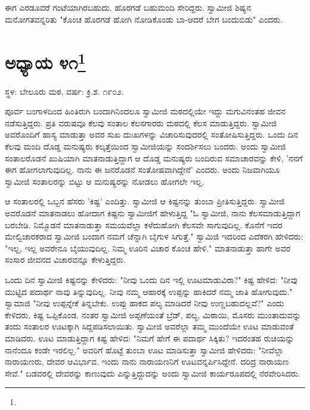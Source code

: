 ಈಗ ಎರಡೂವರೆ ಗಂಟೆಯಾಗಿರಬಹುದು. ಹೊರಗಡೆ ಬಹುಮಂದಿ ಸೇರಿದ್ದರು. ಸ್ವಾಮೀಜಿ ಶಿಷ್ಯನ ಮನೋಗತವನ್ನರಿತು "ಕೊಂಚ ಹೊರಗಡೆ ಹೋಗಿ ನೋಡಿಕೊಂಡು ಬಾ-ಆದರೆ ಬೇಗ ಬಂದುಬಿಡು" ಎಂದರು.

\newpage

\chapter[ಅಧ್ಯಾಯ ೪೧]{ಅಧ್ಯಾಯ ೪೧\protect\footnote{}}

\begin{center}
ಸ್ಥಳ: ಬೇಲೂರು ಮಠ, ವರ್ಷ: ಕ್ರಿ.ಶ. ೧೯೦೨.
\end{center}

ಪೂರ್ವ ಬಂಗಾಳದಿಂದ ಹಿಂತಿರುಗಿ ಬಂದಾಗಿನಿಂದಲೂ ಸ್ವಾಮೀಜಿ ಮಠದಲ್ಲಿಯೇ ಇದ್ದು ಮಗುವಿನಂತಹ ಜೀವನ ನಡೆಸುತ್ತಿದ್ದರು. ಪ್ರತಿ ವರುಷವೂ ಕೆಲವು ಸಂತಾಲ ಕೆಲಸಗಾರರು ಮಠದಲ್ಲಿ ಕೆಲಸ ಮಾಡುತ್ತಿದ್ದರು. ಸ್ವಾಮೀಜಿ ಅವರೊಂದಿಗೆ ಹಾಸ್ಯ ಮಾಡುತ್ತಾ ಅವರ ಸುಖ ದುಃಖಗಳನ್ನು ವಿಚಾರಿಸುವುದರಲ್ಲಿ ಸಂತೋಷಿಸುತ್ತಿದ್ದರು. ಒಂದು ದಿನ ಕೆಲವು ಮಂದಿ ದೊಡ್ಡ ಮನುಷ್ಯರು ಕಲ್ಕತ್ತೆಯಿಂದ ಸ್ವಾಮೀಜಿಯನ್ನು ಸಂದರ್ಶಿಸಲು ಬಂದರು. ಅಂದು ಸ್ವಾಮೀಜಿ ಸಂತಾಲರೊಡನೆ ಖುಷಿಯಾಗಿ ಮಾತನಾಡುತ್ತಿದ್ದಾಗ ಆ ದೊಡ್ಡ ಮನುಷ್ಯರು ಬಂದಿರುವ ಸಮಾಚಾರವನ್ನು ಕೇಳಿ, 'ನನಗೆ ಈಗ ಹೋಗಲಾಗುವುದಿಲ್ಲ. ನಾನು ಈ ಜನರೊಡನೆ ಸಂತೋಷವಾಗಿದ್ದೇನೆ' ಎಂದರು. ಅಂದು ನಿಜವಾಗಿಯೂ ಸ್ವಾಮೀಜಿ ಸಂತಾಲರನ್ನು ಬಿಟ್ಟು ಆ ಮನುಷ್ಯರನ್ನು ನೋಡಲು ಹೋಗಲೇ ಇಲ್ಲ.

ಆ ಸಂತಾಲರಲ್ಲಿ ಒಬ್ಬನ ಹೆಸರು 'ಕಿಷ್ಟ' ಎಂದಿತ್ತು. ಸ್ವಾಮೀಜಿ ಆ ಕಿಷ್ಟನನ್ನು ತುಂಬಾ ಪ್ರೀತಿಸುತ್ತಿದ್ದರು. ಸ್ವಾಮೀಜಿ ಅವರೊಡನೆ ಮಾತನಾಡಲು ಹೋದಾಗ ಕಿಷ್ಟನು ಸ್ವಾಮೀಜಿಗೆ ಹೇಳುತ್ತಿದ್ದ "ಓ ಸ್ವಾಮೀಜಿ, ನಾನು ಕೆಲಸಮಾಡುತ್ತಿದ್ದಾಗ ಬರಬೇಡಿ. ನಿಮ್ಮೊಡನೆ ಮಾತನಾಡುತ್ತಾ ಸಮಯವೆಲ್ಲಾ ಕಳೆದುಹೋಗಿ ಕೆಲಸವೇ ಸಾಗುವುದಿಲ್ಲ. ಕೊನೆಗೆ ಇದರ ಮೇಲ್ವಿಚಾರಕರಾದ ಸ್ವಾಮೀಜಿ ಬಂದಾಗ ನಮಗೆ ಚೆನ್ನಾಗಿ ಬೈಗುಳ ಸಿಗುತ್ತೆ." ಸ್ವಾಮಿಜಿ ಇದರಿಂದ ಎದೆಕರಗಿ ಹೇಳಿದರು: "ಇಲ್ಲ, ಇಲ್ಲ ಅವರೇನೂ ಬೈಯುವುದಿಲ್ಲ. ನಿಮ್ಮ ಊರಿನ ವಿಚಾರ ಕೊಂಚ ಹೇಳಿ." ಮಾತನಾಡುತ್ತಾ ಹಾಗೇ ಅವರ ಸಂಸಾರ ಜೀವನದ ವಿಚಾರವನ್ನೂ ಕೇಳುತ್ತಿದ್ದರು.

ಒಂದು ದಿನ ಸ್ವಾಮೀಜಿ ಕಿಷ್ಟನನ್ನು ಕೇಳಿದರು: "ನೀವು ಒಂದು ದಿನ ಇಲ್ಲಿ ಊಟಮಾಡುವಿರಾ?" ಕಿಷ್ಟ ಹೇಳಿದ: "ನೀವು ಮುಟ್ಟಿದ ಪದಾರ್ಥ ನಾವು ತಿನ್ನುವುದಿಲ್ಲ. ನೀವು ನಮ್ಮ ಆಹಾರಕ್ಕೆ ಉಪ್ಪನ್ನು ಹಾಕಿದರೆ ನಮ್ಮ ಜಾತಿ ಹೋಗುವುದು." ಸ್ವಾಮಾಜಿ "ನೀವು ಉಪ್ಪನ್ನೇಕೆ ತಿನ್ನಬೇಕು. ಉಪ್ಪು ಹಾಕದ ಪಲ್ಯ ಮಾಡಿದರೆ ನೀವು ಉಣ್ಣಬಹುದಲ್ಲವೆ?" ಎಂದು ಕೇಳಿದರು. ಕಿಷ್ಟ ಒಪ್ಪಿಕೊಂಡ. ನಂತರ ಸ್ವಾಮೀಜಿ ಅಪ್ಪಣೆಯಂತೆ ಬ್ರೆಡ್, ಪಲ್ಯ, ಮಿಠಾಯಿ, ಮೊಸರು ಮುಂತಾದುವನ್ನು ತಂದು ಸಂತಾಲರ ಊಟಕ್ಕಾಗಿ ಸಿದ್ದಪಡಿಸಲಾಯಿತು. ಸ್ವಾಮೀಜಿ ಅವರೆಲ್ಲಾ ತಮ್ಮ ಮುಂದೆಯೇ ಊಟ ಮಾಡುವಂತೆ ಮಾಡಿದರು. ಊಟ ಮಾಡುತ್ತಿದ್ದಾಗ ಕಿಷ್ಟ ಹೇಳಿದ: "ನಿಮಗೆ ಹೇಗೆ ಈ ಪದಾರ್ಥ ಸಿಕ್ಕಿತು? ಇದರಂತಹ ರುಚಿಯನ್ನು ನಾನೆಂದೂ ಕಂಡೇ ಇರಲಿಲ್ಲ." ಅವರಿಗೆ ಹೊಟ್ಟೆ ತುಂಬಾ ಊಟ ಮಾಡಿಸುತ್ತಾ ಸ್ವಾಮೀಜಿ ಹೇಳಿದರು: "ನೀವೆಲ್ಲಾ ನಾರಾಯಣರು, ದೇವರ ಆವಿರ್ಭಾವ. ಇಂದು ನಾನು ನಾರಾಯಣನಿಗೆ ಊಟವನ್ನರ್ಪಿಸಿದ್ದೇನೆ. ದರಿದ್ರ ನಾರಾಯಣ ಸೇವೆ." ಬಡವರಲ್ಲಿ ದೇವರನ್ನು ಕಾಣುವುದು ಎನ್ನುತ್ತಿದ್ದುದನ್ನು ಅಂದು ಸ್ವಾಮೀಜಿ ಕಾರ್ಯರೂಪದಲ್ಲಿ ನೆರವೇರಿಸಿದರು.

